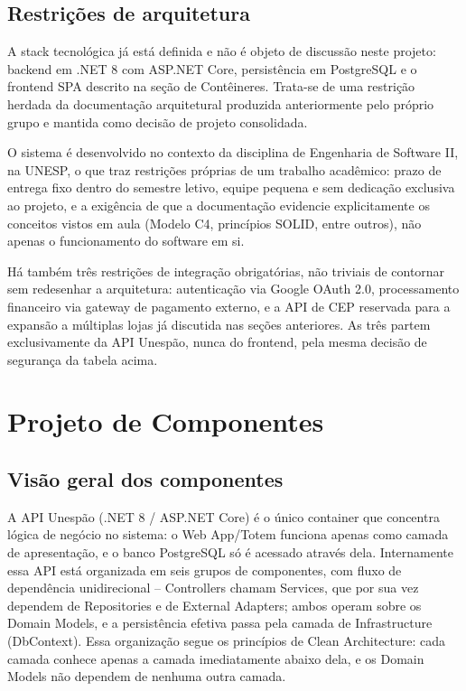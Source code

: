 \documentclass[a4paper,12pt,oneside,openany]{book}
\begin{document}
\section{Restrições de arquitetura}

A stack tecnológica já está definida e não é objeto de discussão neste projeto: backend em .NET 8 com ASP.NET Core, persistência em PostgreSQL e o frontend SPA descrito na seção de Contêineres. Trata-se de uma restrição herdada da documentação arquitetural produzida anteriormente pelo próprio grupo e mantida como decisão de projeto consolidada.

O sistema é desenvolvido no contexto da disciplina de Engenharia de Software II, na UNESP, o que traz restrições próprias de um trabalho acadêmico: prazo de entrega fixo dentro do semestre letivo, equipe pequena e sem dedicação exclusiva ao projeto, e a exigência de que a documentação evidencie explicitamente os conceitos vistos em aula (Modelo C4, princípios SOLID, entre outros), não apenas o funcionamento do software em si.

Há também três restrições de integração obrigatórias, não triviais de contornar sem redesenhar a arquitetura: autenticação via Google OAuth 2.0, processamento financeiro via gateway de pagamento externo, e a API de CEP reservada para a expansão a múltiplas lojas já discutida nas seções anteriores. As três partem exclusivamente da API Unespão, nunca do frontend, pela mesma decisão de segurança da tabela acima.

\chapter{Projeto de Componentes}

\section{Visão geral dos componentes}

A API Unespão (.NET 8 / ASP.NET Core) é o único container que concentra lógica de negócio no sistema: o Web App/Totem funciona apenas como camada de apresentação, e o banco PostgreSQL só é acessado através dela. Internamente essa API está organizada em seis grupos de componentes, com fluxo de dependência unidirecional -- Controllers chamam Services, que por sua vez dependem de Repositories e de External Adapters; ambos operam sobre os Domain Models, e a persistência efetiva passa pela camada de Infrastructure (DbContext). Essa organização segue os princípios de Clean Architecture: cada camada conhece apenas a camada imediatamente abaixo dela, e os Domain Models não dependem de nenhuma outra camada.
\end{document}
